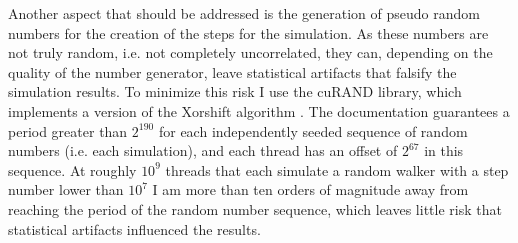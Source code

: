 Another aspect that should be addressed is the generation of pseudo random numbers for the creation of the steps for the simulation. As these numbers are not truly random, i.e. not completely uncorrelated, they can, depending on the quality of the number generator, leave statistical artifacts that falsify the simulation results. To minimize this risk I use the cuRAND library, which implements a version of the Xorshift algorithm \cite{marsaglia2003xorshift}. The documentation guarantees a period greater than $2^{190}$ for each independently seeded sequence of random numbers (i.e. each simulation), and each thread has an offset of $2^{67}$ in this sequence. At roughly $10^{9}$ threads that each simulate a random walker with a step number lower than $10^{7}$ I am more than ten orders of magnitude away from reaching the period of the random number sequence, which leaves little risk that statistical artifacts influenced the results.
